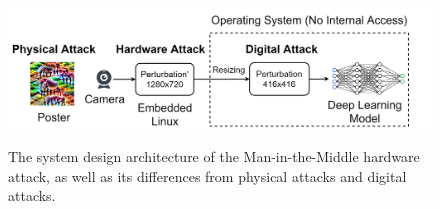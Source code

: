 \begin{figure}[tpbh]
    \centering
    \includegraphics[width=0.85\linewidth]{figures/chapter_detection/minm_attack.jpg}
    \label{fig:comparison} 

    \caption{The system design architecture of the Man-in-the-Middle hardware attack, as well as its differences from physical attacks and digital attacks.}

  \label{fig:hardware}
\end{figure}





